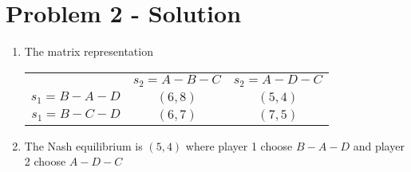 \section{Problem 2 - Solution}
\begin{enumerate}
\item The matrix representation \\
  \begin{tabular}{ r|c|c| }
    \multicolumn{1}{r}{}
    &  \multicolumn{1}{c}{$s_2 = A-B-C$}
    & \multicolumn{1}{c}{$s_2 = A-D-C$} \\
    \cline{2-3}
    $s_1 = B-A-D$ & $(6,8)$ & $(5,4)$ \\
    \cline{2-3}
    $s_1 = B-C-D$ & $(6,7)$ & $(7,5)$ \\
    \cline{2-3}
  \end{tabular}
\item The Nash equilibrium is $(5,4)$ where player 1 choose $B-A-D$ and player 2 choose $A-D-C$
\end{enumerate}

